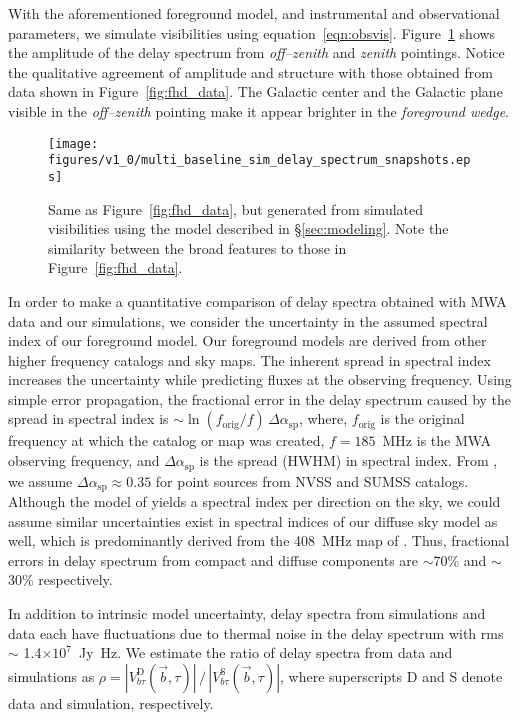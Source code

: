\documentclass[preprint2,iop,numberedappendix]{emulateapj}
\begin{document}
With the aforementioned foreground model, and instrumental and observational parameters, we simulate visibilities using equation~\ref{eqn:obsvis}. Figure~\ref{fig:sim_data} shows the amplitude of the delay spectrum from {\it off--zenith} and {\it zenith} pointings. Notice the qualitative agreement of amplitude and structure with those obtained from data shown in Figure~\ref{fig:fhd_data}. The Galactic center and the Galactic plane visible in the {\it off--zenith} pointing make it appear brighter in the {\it foreground wedge}. 

\begin{figure}[htb]
\centering
\texttt{[image: figures/v1\_0/multi\_baseline\_sim\_delay\_spectrum\_snapshots.eps]}
\caption{Same as Figure~\ref{fig:fhd_data}, but generated from simulated visibilities using the model described in \S\ref{sec:modeling}. Note the similarity between the broad features to those in Figure~\ref{fig:fhd_data}. \label{fig:sim_data}}
\end{figure}

In order to make a quantitative comparison of delay spectra obtained with MWA data and our simulations, we consider the uncertainty in the assumed spectral index of our foreground model. Our foreground models are derived from other higher frequency catalogs and sky maps. The inherent spread in spectral index increases the uncertainty while predicting fluxes at the observing frequency. Using simple error propagation, the fractional error in the delay spectrum caused by the spread in spectral index is $\sim \ln(f_\textrm{orig}/f)\,\Delta\alpha_\textrm{sp}$, where, $f_\textrm{orig}$ is the original frequency at which the catalog or map was created, $f=185$~MHz is the MWA observing frequency, and $\Delta\alpha_\textrm{sp}$ is the spread (HWHM) in spectral index. From \citet{mau03}, we assume $\Delta\alpha_\textrm{sp} \approx 0.35$ for point sources from NVSS and SUMSS catalogs. Although the model of \citet{deo08} yields a spectral index per direction on the sky, we could assume similar uncertainties exist in spectral indices of our diffuse sky model as well, which is predominantly derived from the 408~MHz map of \citet{has82}. Thus, fractional errors in delay spectrum from compact and diffuse components are $\sim$70\% and $\sim$30\% respectively. 

In addition to intrinsic model uncertainty, delay spectra from simulations and data each have fluctuations due to thermal noise in the delay spectrum with rms $\sim$ 1.4$\times 10^7$~Jy~Hz. We estimate the ratio of delay spectra from data and simulations as $\rho = |V^\textrm{D}_{b\tau}(\vec{b},\tau)|\,/\,|V^\textrm{S}_{b\tau}(\vec{b},\tau)|$, where superscripts D and S denote data and simulation, respectively. 
\end{document}
